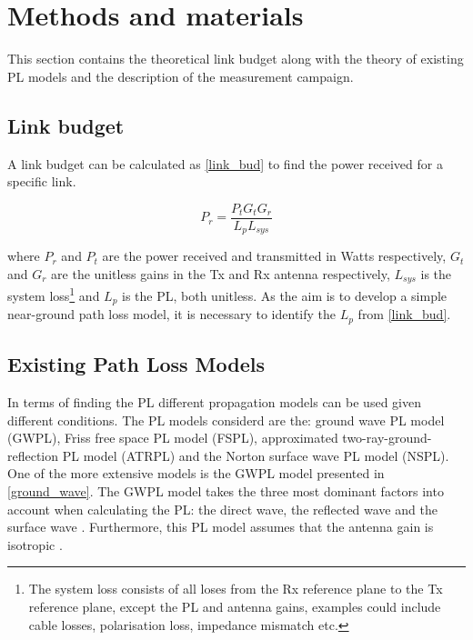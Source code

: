 \section{Methods and materials}
This section contains the theoretical link budget along with the theory of existing PL models and the description of the measurement campaign.

\subsection{Link budget}
A link budget can be calculated as \eqref{link_bud} to find the power received for a specific link.

\begin{equation}
P_{r} = \frac{P_{t}G_{t}G_{r}}{L_{p}L_{sys}}
\label{link_bud}
\end{equation}

where $P_{r}$ and $P_{t}$ are the power received and transmitted in Watts respectively, $G_t$ and $G_r$ are the unitless gains in the Tx and Rx antenna respectively, $L_{sys}$ is the system loss\footnote{The system loss consists of all loses from the Rx reference plane to the Tx reference plane, except the PL and antenna gains, examples could include cable losses, polarisation loss, impedance mismatch etc.} and $L_{p}$ is the PL, both unitless. As the aim is to develop a simple near-ground path loss model, it is necessary to identify the $L_{p}$ from \eqref{link_bud}.


\subsection{Existing Path Loss Models}

In terms of finding the PL different propagation models can be used given different conditions. The PL models considerd are the: ground wave PL model (GWPL), Friss free space PL model (FSPL), approximated two-ray-ground-reflection PL model (ATRPL) and the Norton surface wave PL model (NSPL). One of the more extensive models is the GWPL model presented in \eqref{ground_wave}. The GWPL model takes the three most dominant factors into account when calculating the PL: the direct wave, the reflected wave and the surface wave \cite{Chong,Bullington}. Furthermore, this PL model assumes that the antenna gain is isotropic \cite{Bullington}.  


